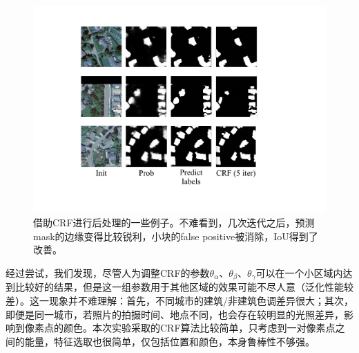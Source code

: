\documentclass[a4paper,12pt]{article}
\begin{document}
\begin{CJK*}{UTF8}{gbsn}
\begin{spacing}{1.2}
    \begin{figure} [!]
    \centering
    \includegraphics[width=14.0cm]{CRF_1.pdf}
    \caption{借助CRF进行后处理的一些例子。不难看到，几次迭代之后，预测mask的边缘变得比较锐利，小块的false positive被消除，IoU得到了改善。}
    \label{fig:Fig 2}
    \end{figure}

    经过尝试，我们发现，尽管人为调整CRF的参数$\theta_{\alpha}$、$\theta_{\beta}$、$\theta_{\gamma}$可以在一个小区域内达到比较好的结果，但是这一组参数用于其他区域的效果可能不尽人意（泛化性能较差）。这一现象并不难理解：首先，不同城市的建筑/非建筑色调差异很大；其次，即便是同一城市，若照片的拍摄时间、地点不同，也会存在较明显的光照差异，影响到像素点的颜色。本次实验采取的CRF算法比较简单，只考虑到一对像素点之间的能量，特征选取也很简单，仅包括位置和颜色，本身鲁棒性不够强。


\end{spacing}
\end{CJK*}
\end{document}
